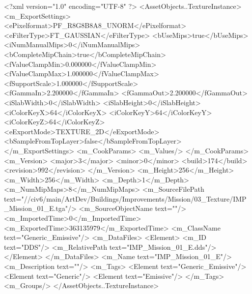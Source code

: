 <?xml version="1.0" encoding="UTF-8" ?>
<AssetObjects..TextureInstance>
	<m_ExportSettings>
		<ePixelformat>PF_R8G8B8A8_UNORM</ePixelformat>
		<eFilterType>FT_GAUSSIAN</eFilterType>
		<bUseMips>true</bUseMips>
		<iNumManualMips>0</iNumManualMips>
		<bCompleteMipChain>true</bCompleteMipChain>
		<fValueClampMin>0.000000</fValueClampMin>
		<fValueClampMax>1.000000</fValueClampMax>
		<fSupportScale>1.000000</fSupportScale>
		<fGammaIn>2.200000</fGammaIn>
		<fGammaOut>2.200000</fGammaOut>
		<iSlabWidth>0</iSlabWidth>
		<iSlabHeight>0</iSlabHeight>
		<iColorKeyX>64</iColorKeyX>
		<iColorKeyY>64</iColorKeyY>
		<iColorKeyZ>64</iColorKeyZ>
		<eExportMode>TEXTURE_2D</eExportMode>
		<bSampleFromTopLayer>false</bSampleFromTopLayer>
	</m_ExportSettings>
	<m_CookParams>
		<m_Values/>
	</m_CookParams>
	<m_Version>
		<major>3</major>
		<minor>0</minor>
		<build>174</build>
		<revision>992</revision>
	</m_Version>
	<m_Height>256</m_Height>
	<m_Width>256</m_Width>
	<m_Depth>1</m_Depth>
	<m_NumMipMaps>8</m_NumMipMaps>
	<m_SourceFilePath text="//civ6/main/ArtDev/Buildings/Improvements/Mission/03_Texture/IMP_Mission_01_E.tga"/>
	<m_SourceObjectName text=""/>
	<m_ImportedTime>0</m_ImportedTime>
	<m_ExportedTime>363135979</m_ExportedTime>
	<m_ClassName text="Generic_Emissive"/>
	<m_DataFiles>
		<Element>
			<m_ID text="DDS"/>
			<m_RelativePath text="IMP_Mission_01_E.dds"/>
		</Element>
	</m_DataFiles>
	<m_Name text="IMP_Mission_01_E"/>
	<m_Description text=""/>
	<m_Tags>
		<Element text="Generic_Emissive"/>
		<Element text="Generic"/>
		<Element text="Emissive"/>
	</m_Tags>
	<m_Groups/>
</AssetObjects..TextureInstance>

